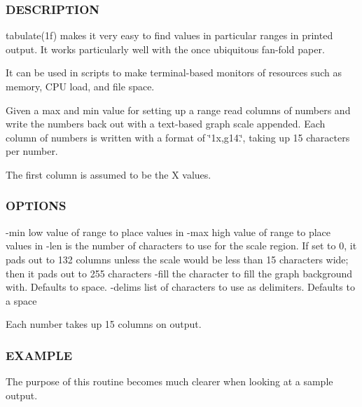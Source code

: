 \subsubsection*{D\+E\+S\+C\+R\+I\+P\+T\+I\+ON}

tabulate(1f) makes it very easy to find values in particular ranges in printed output. It works particularly well with the once ubiquitous fan-\/fold paper.

It can be used in scripts to make terminal-\/based monitors of resources such as memory, C\+PU load, and file space.

Given a max and min value for setting up a range read columns of numbers and write the numbers back out with a text-\/based graph scale appended. Each column of numbers is written with a format of \char`\"{}1x,g14.\char`\"{}, taking up 15 characters per number.

The first column is assumed to be the X values.

\subsubsection*{O\+P\+T\+I\+O\+NS}

-\/min low value of range to place values in -\/max high value of range to place values in -\/len is the number of characters to use for the scale region. If set to 0, it pads out to 132 columns unless the scale would be less than 15 characters wide; then it pads out to 255 characters -\/fill the character to fill the graph background with. Defaults to space. -\/delims list of characters to use as delimiters. Defaults to a space

Each number takes up 15 columns on output.

\subsubsection*{E\+X\+A\+M\+P\+LE}

The purpose of this routine becomes much clearer when looking at a sample output.

